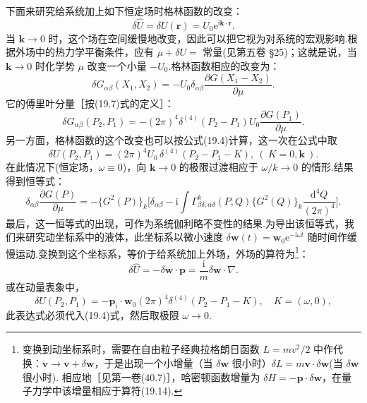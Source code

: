 下面来研究给系统加上如下恒定场时格林函数的改变：
\begin{equation}
  \delta\hat{U}=\delta U(\bm{r})=U_0\mathrm{e}^{\mathrm{i}\bm{k}\cdot\bm{r}}.
\end{equation}
当 $\bm{k}\to0$ 时，这个场在空间缓慢地改变，因此可以把它视为对系统的宏观影响.根据外场中的热力学平衡条件，应有 $\mu+\delta U=$ 常量(见第五卷 §25)；这就是说，当 $\bm{k}\to0$ 时化学势 $\mu$ 改变一个小量 $-U_0$.格林函数相应的改变为：
\begin{equation*}
  \delta G_{\alpha\beta}(X_1,X_2)=-U_0\delta_{\alpha\beta}\frac{\partial G(X_1-X_2)}{\partial\mu}.
\end{equation*}
它的傅里叶分量［按(19.7)式的定义］：
\begin{equation*}
  \delta G_{\alpha\beta}(P_2,P_1)=-(2\pi)^4\delta^{(4)}(P_2-P_1)U_0\frac{\partial G(P_1)}{\partial\mu}.
\end{equation*}
另一方面，格林函数的这个改变也可以按公式(19.4)计算，这一次在公式中取
\begin{equation*}
  \delta U(P_2,P_1)=(2\pi)^4U_0\,\delta^{(4)}(P_2-P_1-K),\ (\ K=0,\bm{k}\ ).
\end{equation*}
在此情况下(恒定场，$\omega\equiv0$)，向 $\bm{k}\to0$ 的极限过渡相应于 $\omega/k\to0$ 的情形.结果得到恒等式：
\begin{equation}
  \delta_{\alpha\beta}\frac{\partial G(P)}{\partial\mu}
  =-\bigl\{G^2(P)\bigr\}_{k}\biggl[\delta_{\alpha\beta}-\mathrm{i}\int\Gamma^{k}_{\beta\delta,\alpha\delta}(P,Q)\bigl\{G^2(Q)\bigr\}_{k}\frac{\mathrm{d}^4Q}{(2\pi)^4}\biggr].
\end{equation}
最后，这一恒等式的出现，可作为系统伽利略不变性的结果.为导出该恒等式，我们来研究动坐标系中的液体，此坐标系以微小速度 $\delta\bm{w}(t)=\bm{w}_0\mathrm{e}^{-\mathrm{i}\omega t}$ 随时间作缓慢运动.变换到这个坐标系，等价于给系统加上外场，外场的算符为\footnote{变换到动坐标系时，需要在自由粒子经典拉格朗日函数 $L=mv^2/2$ 中作代换：$\bm{v}\to\bm{v}+\delta\bm{w}$，于是出现一个小增量（当 $\delta\bm{w}$ 很小时）$\delta L=m\bm{v}\cdot\delta\bm{w}$(当 $\delta\bm{w}$ 很小时). 相应地［见第一卷(40.7)］，哈密顿函数增量为 $\delta H=-\bm{p}\cdot\delta\bm{w}$，在量子力学中该增量相应于算符(19.14).}：
\begin{equation}
  \delta\hat{U}=-\delta\bm{w}\cdot\bm{p}=\frac{\mathrm{i}}{m}\delta\bm{w}\cdot\nabla.
\end{equation}
或在动量表象中，
\begin{equation*}
  \delta U(P_2,P_1)=-\bm{p}_i\cdot\bm{w}_0(2\pi)^4\delta^{(4)}(P_2-P_1-K),\quad K=(\omega,0),
\end{equation*}
此表达式必须代入(19.4)式，然后取极限 $\omega\to0$.

